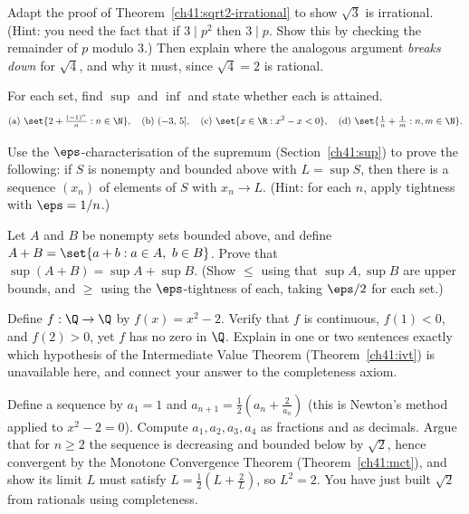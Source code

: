 \begin{exercise}
\label{ch41:ex-sqrt3}
Adapt the proof of Theorem~\ref{ch41:sqrt2-irrational} to show $\sqrt 3$ is irrational.
(Hint: you need the fact that if $3 \mid p^2$ then $3 \mid p$. Show this by checking the
remainder of $p$ modulo $3$.) Then explain where the analogous argument \emph{breaks down}
for $\sqrt 4$, and why it must, since $\sqrt4=2$ is rational.
\end{exercise}

\begin{exercise}
\label{ch41:ex-sup-inf}
For each set, find $\sup$ and $\inf$ and state whether each is attained.
\[
\text{(a) } \set{2 + \tfrac{(-1)^n}{n} : n\in\N}, \quad
\text{(b) } (-3,\,5], \quad
\text{(c) } \set{x\in\R : x^2 - x < 0}, \quad
\text{(d) } \set{\tfrac{1}{n}+\tfrac{1}{m} : n,m\in\N}.
\]
\end{exercise}

\begin{exercise}
\label{ch41:ex-eps-char}
Use the $\eps$-characterisation of the supremum (Section~\ref{ch41:sup}) to prove the
following: if $S$ is nonempty and bounded above with $L=\sup S$, then there is a sequence
$(x_n)$ of elements of $S$ with $x_n \to L$. (Hint: for each $n$, apply tightness with
$\eps = 1/n$.)
\end{exercise}

\begin{exercise}
\label{ch41:ex-sup-sum}
Let $A$ and $B$ be nonempty sets bounded above, and define
$A+B = \set{a+b : a\in A,\ b\in B}$. Prove that $\sup(A+B) = \sup A + \sup B$. (Show
$\le$ using that $\sup A,\sup B$ are upper bounds, and $\ge$ using the $\eps$-tightness of
each, taking $\eps/2$ for each set.)
\end{exercise}

\begin{exercise}
\label{ch41:ex-ivt-rational}
Define $f:\Q\to\Q$ by $f(x)=x^2-2$. Verify that $f$ is continuous, $f(1)<0$, and $f(2)>0$,
yet $f$ has no zero in $\Q$. Explain in one or two sentences exactly which hypothesis of the
Intermediate Value Theorem (Theorem~\ref{ch41:ivt}) is unavailable here, and connect your
answer to the completeness axiom.
\end{exercise}

\begin{exercise}
\label{ch41:ex-monotone}
Define a sequence by $a_1 = 1$ and $a_{n+1} = \tfrac12\!\left(a_n + \tfrac{2}{a_n}\right)$
(this is Newton's method applied to $x^2-2=0$). Compute $a_1,a_2,a_3,a_4$ as fractions and
as decimals. Argue that for $n\ge 2$ the sequence is decreasing and bounded below by
$\sqrt2$, hence convergent by the Monotone Convergence Theorem
(Theorem~\ref{ch41:mct}), and show its limit $L$ must satisfy $L=\tfrac12(L+\tfrac2L)$, so
$L^2=2$. You have just built $\sqrt2$ from rationals using completeness.
\end{exercise}

